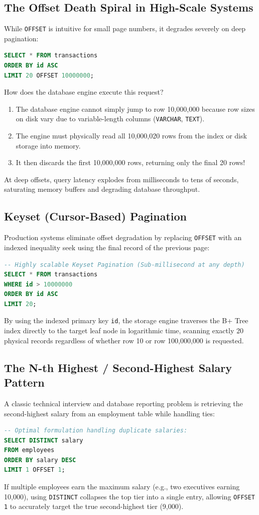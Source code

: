 \documentclass[10pt,journal,compsoc,onecolumn]{IEEEtran}
\begin{document}
\subsection{The Offset Death Spiral in High-Scale Systems}
While \texttt{OFFSET} is intuitive for small page numbers, it degrades severely on deep pagination:
\begin{lstlisting}[language=SQL]
SELECT * FROM transactions 
ORDER BY id ASC 
LIMIT 20 OFFSET 10000000;
\end{lstlisting}
How does the database engine execute this request?
\begin{enumerate}
    \item The database engine cannot simply jump to row 10,000,000 because row sizes on disk vary due to variable-length columns (\texttt{VARCHAR}, \texttt{TEXT}).
    \item The engine must physically read all 10,000,020 rows from the index or disk storage into memory.
    \item It then discards the first 10,000,000 rows, returning only the final 20 rows!
\end{enumerate}
At deep offsets, query latency explodes from milliseconds to tens of seconds, saturating memory buffers and degrading database throughput.

\subsection{Keyset (Cursor-Based) Pagination}
Production systems eliminate offset degradation by replacing \texttt{OFFSET} with an indexed inequality seek using the final record of the previous page:
\begin{lstlisting}[language=SQL]
-- Highly scalable Keyset Pagination (Sub-millisecond at any depth)
SELECT * FROM transactions 
WHERE id > 10000000 
ORDER BY id ASC 
LIMIT 20;
\end{lstlisting}
By using the indexed primary key \texttt{id}, the storage engine traverses the B+ Tree index directly to the target leaf node in logarithmic time, scanning exactly 20 physical records regardless of whether row 10 or row 100,000,000 is requested.

\subsection{The N-th Highest / Second-Highest Salary Pattern}
A classic technical interview and database reporting problem is retrieving the second-highest salary from an employment table while handling ties:
\begin{lstlisting}[language=SQL]
-- Optimal formulation handling duplicate salaries:
SELECT DISTINCT salary 
FROM employees 
ORDER BY salary DESC 
LIMIT 1 OFFSET 1;
\end{lstlisting}
If multiple employees earn the maximum salary (e.g., two executives earning 10,000), using \texttt{DISTINCT} collapses the top tier into a single entry, allowing \texttt{OFFSET 1} to accurately target the true second-highest tier (9,000).
\end{document}
